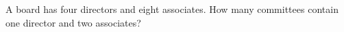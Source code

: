 A board has four directors and eight associates. How many committees contain one director and two associates?
